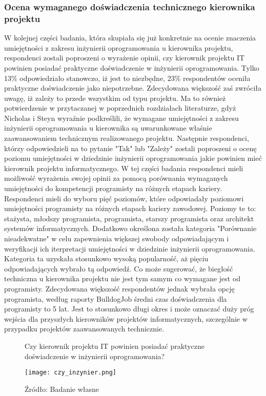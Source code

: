 \subsubsection{Ocena wymaganego doświadczenia technicznego kierownika projektu}
W kolejnej części badania, która skupiała się już konkretnie na ocenie znaczenia umiejętności z zakresu inżynierii oprogramowania u kierownika projektu, respondenci zostali poproszeni o wyrażenie opinii, czy kierownik projektu IT powinien posiadać praktyczne doświadczenie w inżynierii oprogramowania. Tylko 13\% odpowiedziało stanowczo, iż jest to niezbędne, 23\% respondentów oceniła praktyczne doświadczenie jako niepotrzebne. Zdecydowana większość zaś zwróciła uwagę, iż zależy to przede wszystkim od typu projektu. Ma to również potwierdzenie w przytaczanej w poprzednich rozdziałach literaturze, gdyż Nicholas i Steyn\autocite{NicholasSteyn} wyraźnie podkreślili, że wymagane umiejętności z zakresu inżynierii oprogramowania u kierownika są uwarunkowane właśnie zaawansowaniem technicznym realizowanego projektu.
Następnie respondenci, którzy odpowiedzieli na to pytanie "Tak" lub "Zależy" zostali poproszeni o ocenę poziomu umiejętności w dziedzinie inżynierii oprogramowania jakie powinien mieć kierownik projektu informatycznego. W tej części badania respondenci mieli możliwość wyrażenia swojej opinii za pomocą porównania wymaganych umiejętności do kompetencji programisty na różnych etapach kariery. Respondenci mieli do wyboru pięć poziomów, które odpowiadały poziomowi umiejętności programisty na różnych etapach kariery zawodowej. Poziomy te to: stażysta, młodszy programista, programista, starszy programista oraz architekt systemów informatycznych. Dodatkowo określona została kategoria "Porównanie nieadekwatne" w celu zapewnienia większej swobody odpowiadającym i weryfikacji ich iterpretacji umiejętności w dziedzinie inżynierii oprogramowania. Kategoria ta uzyskała stosunkowo wysoką popularność, aż pięciu odpowiadających wybrało tą odpowiedź. Co może sugerować, że biegłość techniczna u kierownika projektu nie jest tym samym co wymagane jest od programisty. Zdecydowana większość respondentów jednak wybrała opcję programista, według raporty BulldogJob średni czas doświadczenia dla programisty to 5 lat\autocite{BulldogJob}. Jest to stosunkowo długi okres i może oznaczać duży próg wejścia dla przyszłych kierowników projektów informatycznych, szczególnie w przypadku projektów zaawansowanych technicznie.

\begin{figure}
  \caption{Czy kierownik projektu IT powinien posiadać praktyczne doświadczenie w inżynierii oprogramowania?}
  \centering
  \texttt{[image: czy\_inzynier.png]}
  \caption*{Źródło: Badanie własne}
\end{figure}

